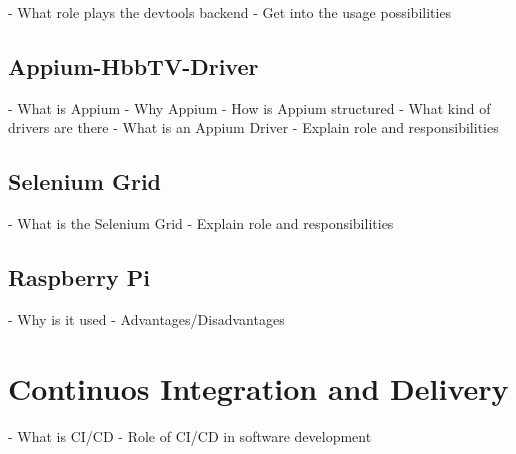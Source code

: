 - What role plays the devtools backend
- Get into the usage possibilities

\subsection{Appium-HbbTV-Driver\label{sec:appiumhbbtvdriver}}

- What is Appium
- Why Appium
- How is Appium structured
- What kind of drivers are there
- What is an Appium Driver
- Explain role and responsibilities

\subsection{Selenium Grid\label{sec:grid}}

- What is the Selenium Grid
- Explain role and responsibilities

\subsection{Raspberry Pi\label{sec:pi}}

- Why is it used
- Advantages/Disadvantages

\section{Continuos Integration and Delivery\label{sec:cicd}}

- What is CI/CD
- Role of CI/CD in software development

